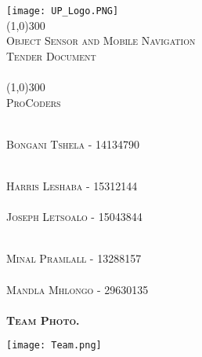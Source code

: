 \documentclass[runningheads,a4paper]{article}
\begin{document}
	
	\begin{titlepage}
		\begin{center}
			\texttt{[image: UP\_Logo.PNG]}  \\
			[1cm]
			\line(1,0){300} \\
			[0.3cm]
			\textsc{\Large
				Object Sensor and Mobile Navigation\\
				Tender Document\\
				\hfill
			}\\
			[0.1cm]
			\line(1,0){300} \\
			[0.7cm]
			\textsc{\Large
				ProCoders
			} \\
		\end{center}
		
		\begin{center}
			\begin{centre}
				\textsc{\large\\
					Bongani Tshela - 14134790\\ 
				}
			
    				\textsc{\large\\
    					Harris Leshaba - 15312144\\ 
    				}
				\textsc{\large\\
					Joseph Letsoalo - 15043844\\ 
				}
				
				\textsc{\large\\
					Minal Pramlall - 13288157\\ 
				}
				\textsc{\large\\
					Mandla Mhlongo - 29630135\\ 
				}
				\textsc{\Large\textbf{\\Team Photo.\\}}
    
                \texttt{[image: Team.png]}

			\end{centre}
			
			
		\end{center}
	\end{titlepage}
	
\end{document}
